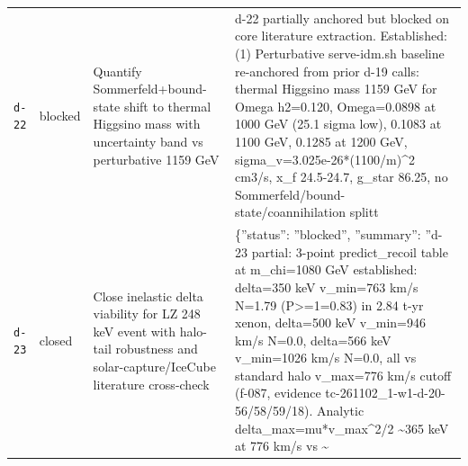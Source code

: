 \documentclass[11pt,a4paper]{article}
\begin{document}
\begin{longtable}{@{}p{}p{}p{}p{}@{}}
\texttt{d-22} & blocked & Quantify Sommerfeld+bound-state shift to thermal Higgsino mass with uncertainty band vs perturbative 1159 GeV & d-22 partially anchored but blocked on core literature extraction. Established: (1) Perturbative serve-idm.sh baseline re-anchored from prior d-19 calls: thermal Higgsino mass 1159 GeV for Omega h2=0.120, Omega=0.0898 at 1000 GeV (25.1 sigma low), 0.1083 at 1100 GeV, 0.1285 at 1200 GeV, sigma\_v=3.025e-26*(1100/m)\textasciicircum{}2 cm3/s, x\_f 24.5-24.7, g\_star 86.25, no Sommerfeld/bound-state/coannihilation splitt \\
\texttt{d-23} & closed & Close inelastic delta viability for LZ 248 keV event with halo-tail robustness and solar-capture/IceCube literature cross-check & \{''status'': ''blocked'', ''summary'': ''d-23 partial: 3-point predict\_recoil table at m\_chi=1080 GeV established: delta=350 keV v\_min=763 km/s N=1.79 (P\textgreater{}=1=0.83) in 2.84 t-yr xenon, delta=500 keV v\_min=946 km/s N=0.0, delta=566 keV v\_min=1026 km/s N=0.0, all vs standard halo v\_max=776 km/s cutoff (f-087, evidence tc-261102\_1-w1-d-20-56/58/59/18). Analytic delta\_max=mu*v\_max\textasciicircum{}2/2 \textasciitilde{}365 keV at 776 km/s vs \textasciitilde{} \\
\bottomrule\end{longtable}
\end{document}
